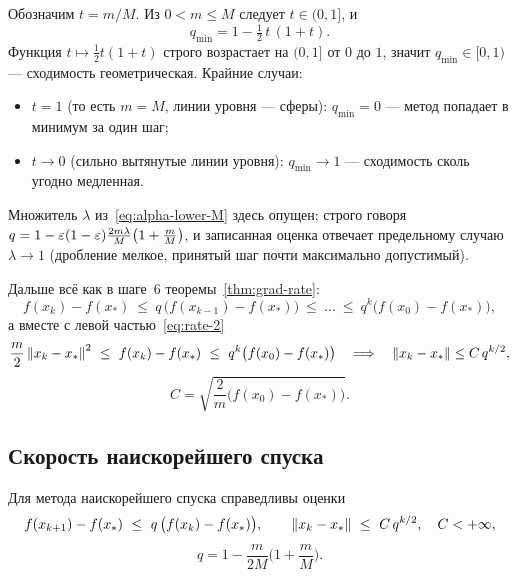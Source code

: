 \begin{idea}[title={Почему $0 \le q_{\min} < 1$}]
Обозначим $t = m/M$. Из $0 < m \le M$ следует $t \in (0,1]$, и
\[
  q_{\min} = 1 - \tfrac{1}{2}\,t\,(1 + t) .
\]
Функция $t \mapsto \tfrac12 t(1+t)$ строго возрастает на $(0,1]$ от $0$ до $1$,
значит $q_{\min} \in [0, 1)$ — сходимость геометрическая. Крайние случаи:
\begin{itemize}[nosep,left=0pt]
  \item $t = 1$ (то есть $m = M$, линии уровня — сферы): $q_{\min} = 0$ —
        метод попадает в минимум за один шаг;
  \item $t \to 0$ (сильно вытянутые линии уровня): $q_{\min} \to 1$ —
        сходимость сколь угодно медленная.
\end{itemize}
Множитель $\lambda$ из~\eqref{eq:alpha-lower-M} здесь опущен; строго говоря
$q = 1 - \varepsilon(1-\varepsilon)\frac{2m\lambda}{M}\big(1 + \frac{m}{M}\big)$, и
записанная оценка отвечает предельному случаю $\lambda \to 1$ (дробление мелкое,
принятый шаг почти максимально допустимый).
\end{idea}

Дальше всё как в шаге~6 теоремы~\ref{thm:grad-rate}:
\[
  f(x_k) - f(x_*) \ \le\ q\,\big(f(x_{k-1}) - f(x_*)\big)
  \ \le\ \dots \ \le\ q^{k}\big(f(x_0) - f(x_*)\big) ,
\]
а вместе с левой частью~\eqref{eq:rate-2}
\[
  \frac{m}{2}\left\lVert x_k - x_* \right\rVert^2 \ \le\ f(x_k) - f(x_*)
  \ \le\ q^{k}\big(f(x_0) - f(x_*)\big)
  \quad\Longrightarrow\quad
  \left\lVert x_k - x_* \right\rVert \le C\, q^{k/2} ,
\]
\[
  C = \sqrt{\frac{2}{m}\big(f(x_0) - f(x_*)\big)} .
\]

\subsection{Скорость наискорейшего спуска}

\begin{theorem}\label{thm:steepest-rate}
Для метода наискорейшего спуска справедливы оценки
\[
  f(x_{k+1}) - f(x_*) \ \le\ q\,\big(f(x_k) - f(x_*)\big) ,
  \qquad
  \left\lVert x_k - x_* \right\rVert \ \le\ C\, q^{k/2} , \quad C < +\infty ,
\]
\[
  q = 1 - \frac{m}{2M}\Big(1 + \frac{m}{M}\Big) .
\]
\end{theorem}

